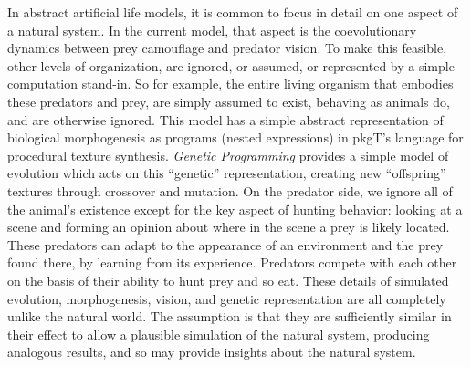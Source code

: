 \documentclass[acmtog]{acmart}
\newcommand{\jargon}[1]{\textit{#1}}
\newcommand{\texsyn}[0]{pkgT}
\begin{document}
In abstract artificial life models, it is common to focus in detail on one aspect of a natural system. In the current model, that aspect is the coevolutionary dynamics between prey camouflage and predator vision. To make this feasible, other levels of organization, are ignored, or assumed, or represented by a simple computation stand-in. So for example, the entire living organism that embodies these predators and prey, are simply assumed to exist, behaving as animals do, and are otherwise ignored. This model has a simple abstract representation of biological morphogenesis as programs (nested expressions) in \texsyn{}'s language for procedural texture synthesis. \jargon{Genetic Programming} provides a simple model of evolution which acts on this “genetic” representation, creating new “offspring” textures through crossover and mutation. On the predator side, we ignore all of the animal's existence except for the key aspect of hunting behavior: looking at a scene and forming an opinion about where in the scene a prey is likely located. These predators can adapt to the appearance of an environment and the prey found there, by learning from its experience. Predators compete with each other on the basis of their ability to hunt prey and so eat. These details of simulated evolution, morphogenesis, vision, and genetic representation are all completely unlike the natural world. The assumption is that they are sufficiently similar in their effect to allow a plausible simulation of the natural system, producing analogous results, and so may provide insights about the natural system.
\par

\end{document}
